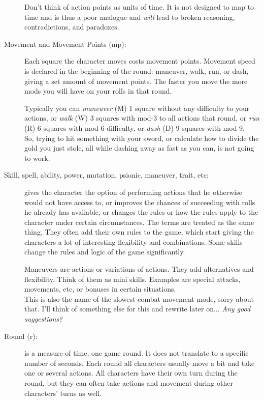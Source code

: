 \begin{description}
Don't think of action points as units of time. It is not designed to map to time and is thus a poor analogue and \emph{will} lead to broken reasoning, contradictions, and paradoxes.


\item[Movement and Movement Points (mp):]
Each square the character moves costs movement points. Movement speed is declared in the beginning of the round: maneuver, walk, run, or dash, giving a set amount of movement points. The faster you move the more mods you will have on your rolls in that round.

Typically you can \emph{maneuver} (M) 1 square without any difficulty to your actions, or \emph{walk} (W) 3 squares with mod-3 to all actions that round, or \emph{run} (R) 6 squares with mod-6 difficulty, or \emph{dash} (D) 9 squares with mod-9.\\
So, trying to hit something with your sword, or calculate how to divide the gold you just stole, all while dashing away as fast as you can, is not going to work.


\item[Skill, spell, ability, power, mutation, psionic, maneuver, trait, etc:] gives the character the option of performing actions that he otherwise would not have access to, or improves the chances of succeeding with rolls he already has available, or changes the rules or how the rules apply to the character under certain circumstances. The terms are treated as the same thing. They often add their own rules to the game, which start giving the characters a lot of interesting flexibility and combinations. Some skills change the rules and logic of the game significantly.

Maneuvers are actions or variations of actions. They add alternatives and flexibility. Think of them as mini skills. Examples are special attacks, movements, etc, or bonuses in certain situations.
\\   \todo This is also the name of the slowest combat movement mode, sorry about that. I'll think of something else for this and rewrite later on... \emph{Any good suggestions?}


\item[Round (r):] is a measure of time, one game round. It does not translate to a specific number of seconds. Each round all characters usually move a bit and take one or several actions. All characters have their own turn during the round, but they can often take actions and movement during other characters' turns as well.


\end{description}
